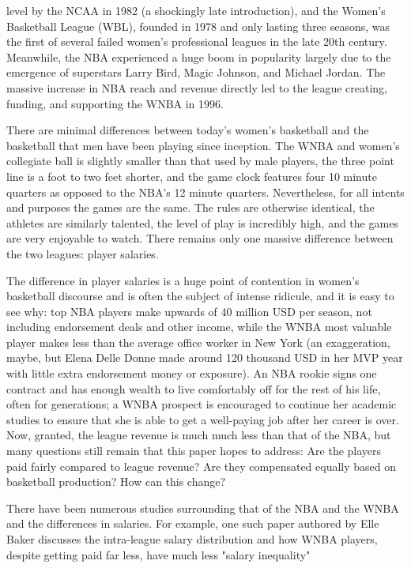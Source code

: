 \documentclass[12pt]{article}
\begin{document}
level by the NCAA in 1982 (a shockingly late introduction), and the Women’s Basketball League (WBL), founded in 1978 and only lasting three seasons, was 
the first of several failed women’s professional leagues in the late 20th century. Meanwhile, the NBA experienced a huge boom in popularity largely due to 
the emergence of superstars Larry Bird, Magic Johnson, and Michael Jordan. The massive increase in NBA reach and revenue directly led to the league 
creating, funding, and supporting the WNBA in 1996.
\par
There are minimal differences between today's women’s basketball and the basketball that men have been playing since inception. The WNBA and women's 
collegiate ball is slightly smaller than that used by male players, the three point line is a foot to two feet shorter, and the game clock features 
four 10 minute quarters as opposed to the NBA’s 12 minute quarters. Nevertheless, for all intents and purposes the games are the same. The rules are otherwise 
identical, the athletes are similarly talented, the level of play is incredibly high, and the games are very enjoyable to watch. There remains only one 
massive difference between the two leagues: player salaries.
\par
The difference in player salaries is a huge point of contention in women’s basketball discourse and is often the subject of intense ridicule, and it is 
easy to see why: top NBA players make upwards of 40 million USD per season, not including endorsement deals and other income, while the WNBA most valuable 
player makes less than the average office worker in New York (an exaggeration, maybe, but Elena Delle Donne made around 120 thousand USD in her MVP year 
with little extra endorsement money or exposure). An NBA rookie signs one contract and has enough wealth to live comfortably off for the rest of his life, 
often for generations; a WNBA prospect is encouraged to continue her academic studies to ensure that she is able to get a well-paying job after her career 
is over. Now, granted, the league revenue is much much less than that of the NBA, but many questions still remain that this paper hopes to address: Are 
the players paid fairly compared to league revenue? Are they compensated equally based on basketball production? How can this change?
\par
There have been numerous studies surrounding that of the NBA and the WNBA and the differences in salaries.
For example, one such paper authored by Elle Baker discusses the intra-league salary distribution and
how WNBA players, despite getting paid far less, have much less "salary inequality"
\end{document}
